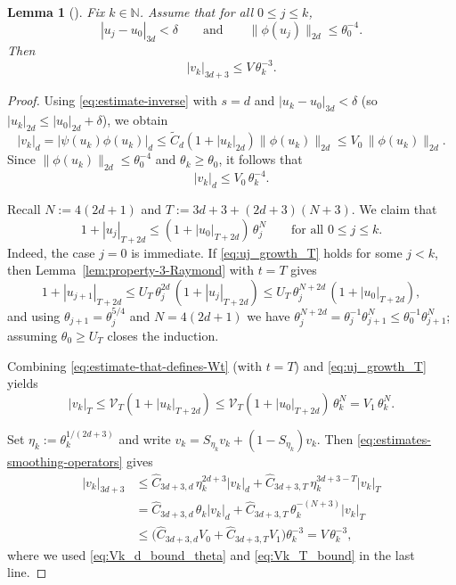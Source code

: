 \documentclass[11pt]{amsart}
\newtheorem{lemma}[theorem]{Lemma}
\begin{document}
\begin{lemma}[{\cite[Lemma~1(ii)]{Raymond1989}}]
	\label{lem:property-2-Raymond}
	Fix $k\in\mathbb{N}$. Assume that for all $0\le j\le k$,
	\[
	|u_j-u_0|_{3d}<\delta
	\qquad\text{and}\qquad
	\|\phi(u_j)\|_{2d}\le \theta_0^{-4}.
	\]
	Then
	\[
	|v_k|_{3d+3}\le V\,\theta_k^{-3}.
	\]
\end{lemma}
\begin{proof}
	Using \eqref{eq:estimate-inverse} with $s=d$ and $|u_k-u_0|_{3d}<\delta$ (so $|u_k|_{2d}\le |u_0|_{2d}+\delta$), we obtain
	\begin{equation}\label{eq:Vk_d_bound}
		|v_k|_d = |\psi(u_k)\phi(u_k)|_d
		\le \widetilde C_d(1+|u_k|_{2d})\|\phi(u_k)\|_{2d}
		\le V_0\,\|\phi(u_k)\|_{2d}.
	\end{equation}
	Since $\|\phi(u_k)\|_{2d}\le \theta_0^{-4}$ and $\theta_k\ge \theta_0$, it follows that
	\begin{equation}\label{eq:Vk_d_bound_theta}
		|v_k|_d \le V_0\,\theta_k^{-4}.
	\end{equation}
	
	Recall $N:=4(2d+1)$ and $T:=3d+3+(2d+3)(N+3)$. We claim that
	\begin{equation}\label{eq:uj_growth_T}
		1+|u_j|_{T+2d}\le (1+|u_0|_{T+2d})\,\theta_j^{N}\qquad\text{for all }0\le j\le k.
	\end{equation}
	Indeed, the case $j=0$ is immediate. If \eqref{eq:uj_growth_T} holds for some $j<k$, then Lemma~\ref{lem:property-3-Raymond} with $t=T$ gives
	\[
	1+|u_{j+1}|_{T+2d}\le U_T\,\theta_j^{2d}\,(1+|u_j|_{T+2d})
	\le U_T\,\theta_j^{N+2d}\,(1+|u_0|_{T+2d}),
	\]
	and using $\theta_{j+1}=\theta_j^{5/4}$ and $N=4(2d+1)$ we have $\theta_j^{N+2d}=\theta_j^{-1}\theta_{j+1}^{N}\le \theta_0^{-1}\theta_{j+1}^{N}$; assuming $\theta_0\ge U_T$ closes the induction.
	
	Combining \eqref{eq:estimate-that-defines-Wt} (with $t=T$) and \eqref{eq:uj_growth_T} yields
	\begin{equation}\label{eq:Vk_T_bound}
		|v_k|_T \le \mathcal V_T(1+|u_k|_{T+2d})
		\le \mathcal V_T(1+|u_0|_{T+2d})\,\theta_k^{N}
		= V_1\,\theta_k^{N}.
	\end{equation}
	
	Set $\eta_k:=\theta_k^{1/(2d+3)}$ and write $v_k=S_{\eta_k}v_k+(1-S_{\eta_k})v_k$. Then \eqref{eq:estimates-smoothing-operators} gives
	\begin{align*}
		|v_k|_{3d+3}
		&\le \widehat C_{3d+3,d}\,\eta_k^{2d+3}|v_k|_d+\widehat C_{3d+3,T}\,\eta_k^{3d+3-T}|v_k|_T \\
		&= \widehat C_{3d+3,d}\,\theta_k|v_k|_d+\widehat C_{3d+3,T}\,\theta_k^{-(N+3)}|v_k|_T \\
		&\le \bigl(\widehat C_{3d+3,d}V_0+\widehat C_{3d+3,T}V_1\bigr)\theta_k^{-3}
		= V\,\theta_k^{-3},
	\end{align*}
	where we used \eqref{eq:Vk_d_bound_theta} and \eqref{eq:Vk_T_bound} in the last line.
\end{proof}
\end{document}
